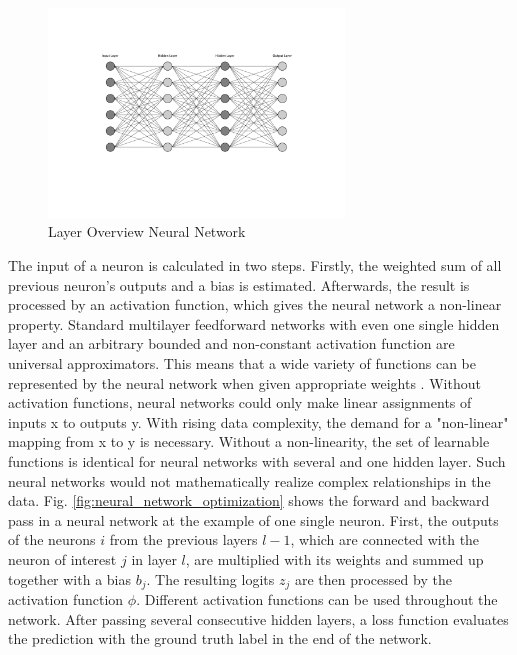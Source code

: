 \begin{figure}[H]
  \centering
  \includegraphics[width=0.7\textwidth]{neural_network_overview.pdf}
  \caption {Layer Overview Neural Network}
  \label{fig:neural_network_overview}
\end{figure}
The input of a neuron is calculated in two steps. Firstly, the weighted sum of all previous neuron's outputs and a bias is estimated. Afterwards, the result is processed by an activation function, which gives the neural network a non-linear property. Standard multilayer feedforward networks with even one single hidden layer and an arbitrary bounded and non-constant activation function are universal approximators. This means that a wide variety of functions can be represented by the neural network when given appropriate weights \cite{HORNIK1991}. Without activation functions, neural networks could only make linear assignments of inputs x to outputs y. With rising data complexity, the demand for a "non-linear" mapping from x to y is necessary. Without a non-linearity, the set of learnable functions is identical for neural networks with several and one hidden layer. Such neural networks would not mathematically realize complex relationships in the data. Fig. \ref{fig:neural_network_optimization} shows the forward and backward pass in a neural network at the example of one single neuron. First, the outputs of the neurons $i$ from the previous layers $l-1$, which are connected with the neuron of interest $j$ in layer $l$, are multiplied with its weights and summed up together with a bias $b_{j}$. The resulting logits $z_{j}$ are then processed by the activation function $\phi$. Different activation functions can be used throughout the network. After passing several consecutive hidden layers, a loss function evaluates the prediction with the ground truth label in the end of the network.

